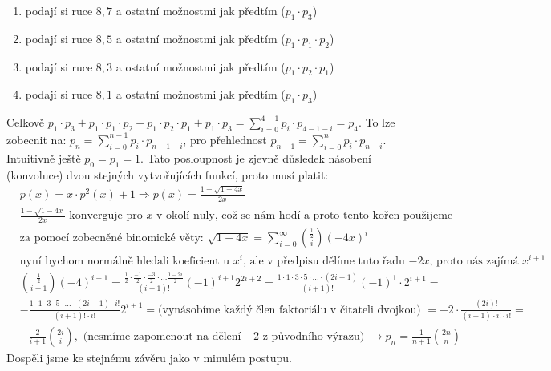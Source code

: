 \documentclass[a4paper]{article}
\begin{document}
\renewcommand{\theenumi}{\Alph{enumi}}
\begin{enumerate}
	\item podají si ruce $8, 7$ a ostatní možnostmi jak předtím ($p_1\cdot p_3$)
	\item podají si ruce $8, 5$ a ostatní možnostmi jak předtím ($p_1\cdot p_1 \cdot p_2$)
	\item podají si ruce $8, 3$ a ostatní možnostmi jak předtím ($p_1\cdot p_2 \cdot p_1$)
	\item podají si ruce $8, 1$ a ostatní možnostmi jak předtím ($p_1\cdot p_3$)
\end{enumerate}
Celkově $p_1\cdot p_3 + p_1\cdot p_1 \cdot p_2 + p_1\cdot p_2 \cdot p_1 + p_1\cdot p_3 = \sum_{i=0}^{4-1} p_i\cdot p_{4-1-i} = p_4$. To lze zobecnit na: $p_{n} = \sum_{i=0}^{n-1} p_i\cdot p_{n-1-i}$, pro přehlednost $p_{n+1} = \sum_{i=0}^{n} p_i\cdot p_{n-i}$. Intuitivně ještě $p_0 = p_1 = 1$. Tato posloupnost je zjevně důsledek násobení (konvoluce) dvou stejných vytvořujících funkcí, proto musí platit:
\begin{align*}
	& p(x) = x\cdot p^2(x) + 1 \Rightarrow p(x) = \frac{1\pm \sqrt{1- 4x}}{2x}\\
	& \frac{1 - \sqrt{1- 4x}}{2x} \text{ konverguje pro $x$ v okolí nuly, což se nám hodí a proto tento kořen použijeme} \\
	& \text{za pomocí zobecněné binomické věty: } \sqrt{1- 4x} = \sum_{i=0}^\infty { \frac{1}{2} \choose i} (-4x)^i \\
	& \text{nyní bychom normálně hledali koeficient u $x^i$, ale v předpisu dělíme tuto řadu $-2x$, proto nás zajímá $x^{i+1}$} \\
	&  { \frac{1}{2} \choose i+1} (-4)^{i+1} = \frac{\frac{1}{2}\cdot \frac{-1}{2}\cdot \frac{-3}{2}\cdot \dots \frac{1-2i}{2} }{(i+1)!} (-1)^{i+1} 2^{2i+2} = \frac{1 \cdot 1 \cdot 3 \cdot 5 \cdot \dots \cdot (2i-1)}{(i+1)!} (-1)^1 \cdot 2^{i+1} = \\
	& -\frac{1 \cdot 1 \cdot 3 \cdot 5 \cdot \dots \cdot (2i-1) \cdot i!}{(i+1)! \cdot i!} 2^{i+1} = \text{(vynásobíme každý člen faktoriálu v čitateli dvojkou) } = -2\cdot \frac{(2i)!}{(i+1)\cdot i! \cdot i!} = \\
	& -\frac{2}{i+1} { {2i} \choose i}, \text{ (nesmíme zapomenout na dělení $-2$ z původního výrazu) } \rightarrow p_n = \frac{1}{n+1} { {2n} \choose n}
\end{align*}
Dospěli jsme ke stejnému závěru jako v minulém postupu.
\pagebreak

\section{}
\end{document}
